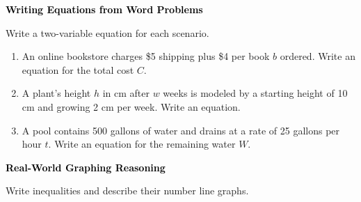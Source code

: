 \documentclass[12pt, letterpaper, fleqn]{article}
\begin{document}
\begin{tcolorbox}[colback=black!10]
\large\textcolor{black}{\textbf{Writing Equations from Word Problems}}
\end{tcolorbox}

\noindent
Write a two-variable equation for each scenario.

\vspace{3mm}

\begin{enumerate}[itemsep=2.2cm, leftmargin=0.6cm]

\item An online bookstore charges \$5 shipping plus \$4 per book $b$ ordered. Write an equation for the total cost $C$.

\vspace{2cm}

\item A plant's height $h$ in cm after $w$ weeks is modeled by a starting height of 10 cm and growing 2 cm per week. Write an equation.

\vspace{2cm}

\item A pool contains 500 gallons of water and drains at a rate of 25 gallons per hour $t$. Write an equation for the remaining water $W$.

\vspace{2cm}

\end{enumerate}

\newpage

\begin{tcolorbox}[colback=black!10]
\large\textcolor{black}{\textbf{Real-World Graphing Reasoning}}
\end{tcolorbox}

\noindent
Write inequalities and describe their number line graphs.

\vspace{3mm}
\end{document}
